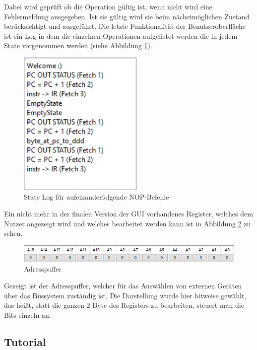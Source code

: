 \documentclass[12pt]{article}
\begin{document}
\noindent
Dabei wird geprüft ob die Operation gültig ist, wenn nicht wird eine Fehlermeldung ausgegeben. Ist sie gültig wird sie beim nächstmöglichen Zustand berücksichtigt und ausgeführt.
\newpage
\noindent
Die letzte Funktionalität der Benutzeroberfläche ist ein Log in dem die einzelnen Operationen aufgelistet werden die in jedem State vorgenommen werden (siehe Abbildung \ref{fig:Logger}).\vspace{10pt}

\begin{figure}[h]
\centering
\includegraphics[width=6cm]{bilder/Logger}
\caption{State Log für aufeinanderfolgende NOP-Befehle}
\label{fig:Logger}
\end{figure}

\noindent
Ein nicht mehr in der finalen Version der GUI vorhandenes Register, welches dem Nutzer angezeigt wird und welches bearbeitet werden kann ist in Abbildung \ref{fig:AddBuff} zu sehen.\vspace{10pt}

\begin{figure}[h]
\centering
\includegraphics[width=15cm]{bilder/AddBuff}
\caption{Adresspuffer}
\label{fig:AddBuff}
\end{figure}

\noindent
Gezeigt ist der Adresspuffer, welcher für das Auswählen von externen Geräten über das Bussystem zuständig ist. Die Darstellung wurde hier bitweise gewählt, das heißt, statt die ganzen 2 Byte des Registers zu bearbeiten, steuert man die Bits einzeln an.

\subsection{Tutorial}
\end{document}
